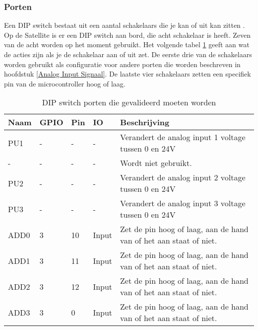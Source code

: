 \subsubsection{Porten}
Een DIP switch bestaat uit een aantal schakelaars die je kan of uit kan zitten \autocite{DIP}. Op de Satellite is er een DIP switch aan bord, die acht schakelaar is heeft. Zeven van de acht worden op het moment gebruikt. Het volgende tabel \ref{tab:hw_val_dip} geeft aan wat de acties zijn als je de schakelaar aan of uit zet. De eerste drie van de schakelaars worden gebruikt als configuratie voor andere porten die worden beschreven in hoofdstuk \ref{Analog Input Signaal}. De laatste vier schakelaars zetten een specifiek pin van de microcontroller hoog of laag.
\begin{table}[h!]
	\caption{DIP switch porten die gevalideerd moeten worden}
	\begin{tabular}{llllp{10cm}}
	\toprule
	\textbf{Naam} & \textbf{GPIO} & \textbf{Pin} & \textbf{IO} & \textbf{Beschrijving}	\\ \toprule
	PU1		& -			& - 	& -    		& Verandert de analog input 1 voltage tussen 0 en 24V	\\
	-		& -			& - 	& -    		& Wordt niet gebruikt.								\\
	PU2		& -			& - 	& -    		& Verandert de analog input 2 voltage tussen 0 en 24V	\\
	PU3		& -			& - 	& -    		& Verandert de analog input 3 voltage tussen 0 en 24V	\\
	ADD0 	& 3			& 10	& Input		& Zet de pin hoog of laag, aan de hand van of het aan staat of niet.		\\
	ADD1 	& 3			& 11	& Input		& Zet de pin hoog of laag, aan de hand van of het aan staat of niet.		\\
	ADD2 	& 3			& 12	& Input		& Zet de pin hoog of laag, aan de hand van of het aan staat of niet.		\\
	ADD3 	& 3			& 0 	& Input		& Zet de pin hoog of laag, aan de hand van of het aan staat of niet.		\\ \bottomrule
	\end{tabular}
	\label{tab:hw_val_dip}
\end{table}
\newpage

